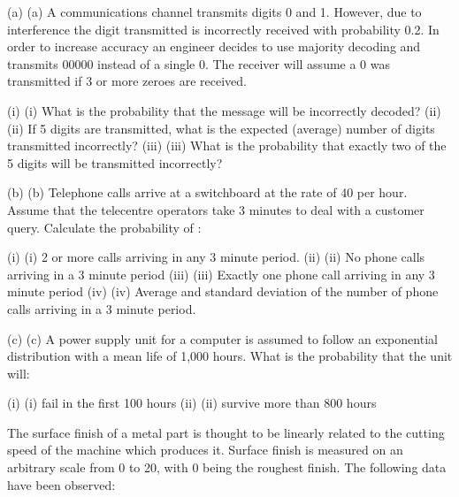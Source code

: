  
 
 
 
 
 

(a)	(a)    A communications channel transmits digits 0 and 1.  However, due to interference the digit transmitted is incorrectly received with probability 0.2.  In order to increase accuracy an engineer decides to use majority decoding and transmits 00000 instead of a single 0.  The receiver will assume a 0 was transmitted if 3 or more zeroes are received. 
 
(i)	(i)                  What is the probability that the message will be incorrectly decoded?
(ii)	(ii)                If 5 digits are transmitted, what is the expected (average) number of digits transmitted incorrectly?
(iii)	(iii)               What is the probability that exactly two of the 5 digits will be transmitted incorrectly?
 

(b)	(b)   Telephone calls arrive at a switchboard at the rate of 40 per hour.  Assume that the telecentre operators take 3 minutes to deal with a customer query.  Calculate the probability of :
 
(i)	(i)                  2 or more calls arriving in any 3 minute period.
(ii)	(ii)                No phone calls arriving in a 3 minute period
(iii)	(iii)               Exactly one phone call arriving in any 3 minute period
(iv)	(iv)              Average and standard deviation of the number of phone calls arriving in a 3 minute period.
 

(c)	(c)    A power supply unit for a computer is assumed to follow an exponential distribution with a mean life of 1,000 hours.  What is the probability that the unit will:
 
(i)	(i)                  fail in the first 100 hours
(ii)	(ii)                survive more than 800 hours
 
 
 

The surface finish of a metal part is thought to be linearly related to the cutting speed of the machine which produces it.  Surface finish is measured on an arbitrary scale from 0 to 20, with 0 being the roughest finish.  The following data have been observed:
 
